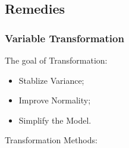 \subsection{Remedies}

\subsubsection{Variable Transformation}
    The goal of Transformation:
        
        \begin{itemize}[topsep=2pt,itemsep=2pt]
            \item Stablize Variance;
            \item Improve Normality;
            \item Simplify the Model.
        \end{itemize}
    
    \begin{point}
        Transformation Methods:
    \end{point}
    

